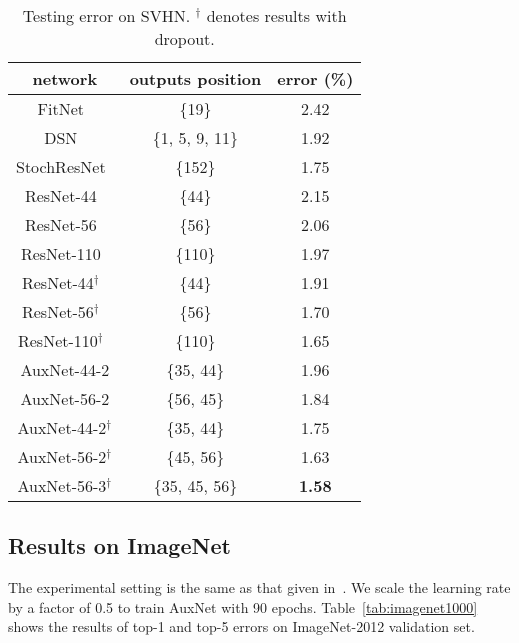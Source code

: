 \documentclass[10pt,onecolumn,letterpaper]{article}
\def\SexyName{AuxNet\xspace}
\begin{document}
\begin{table}[h]
  \centering
  \caption{Testing error on SVHN. $^\dagger$ denotes results with dropout.}
    \begin{tabular}{c|c|c}
    \hline
    network & outputs position & error (\%) \\
    \hline
    FitNet~\cite{romero2014fitnets}      & \{19\}  & 2.42 \\
    DSN~\cite{Lee2015}      & \{1, 5, 9, 11\} & 1.92 \\
    StochResNet~\cite{DBLP:journals/corr/HuangSLSW16}      & \{152\} & 1.75 \\

    ResNet-44~\cite{he2016identity}   & \{44\}    & 2.15 \\
    ResNet-56~\cite{he2016identity}   & \{56\}    & 2.06 \\
    ResNet-110~\cite{he2016identity}  & \{110\}  & 1.97 \\

    ResNet-44$^\dagger$~\cite{he2016identity}   & \{44\}    & 1.91 \\
    ResNet-56$^\dagger$~\cite{he2016identity}   & \{56\}    & 1.70 \\
    ResNet-110$^\dagger$~\cite{he2016identity}   & \{110\}    & 1.65 \\
    \hline
    \SexyName-44-2 & \{35, 44\}    & 1.96 \\
    \SexyName-56-2 & \{56, 45\}    & 1.84 \\
    \SexyName-44-2$^\dagger$ & \{35, 44\}    & 1.75 \\
    \SexyName-56-2$^\dagger$ & \{45, 56\}    & 1.63 \\
    \SexyName-56-3$^\dagger$ & \{35, 45, 56\}    & \textbf{1.58} \\
    \hline
    \end{tabular}
  \label{tab:svhn}%
\end{table}%

\subsection{Results on ImageNet}
The experimental setting is the same as that given in~\cite{he2015deep}. We scale the learning rate by a factor of 0.5 to train \SexyName with 90 epochs.
Table~\ref{tab:imagenet1000} shows the results of top-1 and top-5 errors on ImageNet-2012 validation set.
\end{document}
